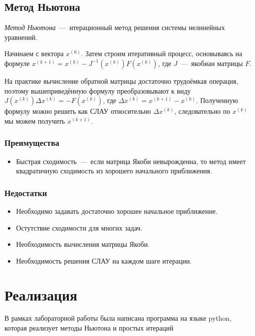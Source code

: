 \documentclass[12pt,a4paper,oneside]{extarticle}
\begin{document}
    \subsection{Метод Ньютона}
        {\it Метод Ньютона}~---~итерационный метод решения системы нелинейных уравнений.

        Начинаем с вектора $x^(0)$. Затем строим итеративный процесс, основываясь на формуле $x^{(k+1)}=x^{(k)}-J^{-1}(x^{(k)})F(x^{(k)})$, где $J$~---~якобиан матрицы $F$.

        На практике вычисление обратной матрицы достаточно трудоёмкая операция, поэтому вышеприведённую формулу преобразовывают к виду $J(x^{(k)})\Delta x^{(k)} = -F(x^{(k)})$, где $\Delta x^{(k)}=x^{(k+1)}-x^{(k)}$. Полученную формулу можно решить как СЛАУ относительно $\Delta x^{(k)}$, следовательно по $x^{(k)}$ мы можем получить $x^{(k+1)}$.

        \subsubsection{Преимущества}
            \begin{itemize}
                \item Быстрая сходимость~---~если матрица Якоби невырожденна, то метод имеет квадратичную сходимость из хорошего начального приближения.
            \end{itemize}
        \subsubsection{Недостатки}
            \begin{itemize}
                \item Необходимо задавать достаточно хорошее начальное приближение.
                \item Остутствие сходимости для многих задач.
                \item Необходимость вычисления матрицы Якоби.
                \item Необходимость решения СЛАУ на каждом шаге итерации.
            \end{itemize}

\section{Реализация}
    В рамках лабораторной работы была написана программа на языке python, которая реализует методы Ньютона и простых итераций
\end{document}
